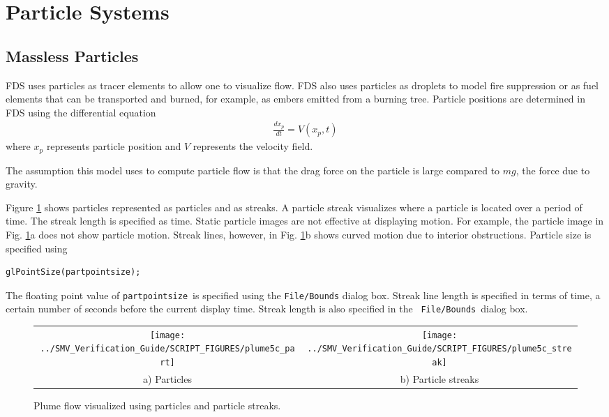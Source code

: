 \documentclass[11pt,twoside]{book}
\begin{document}
\section{Particle Systems}
\subsection{Massless Particles}
FDS uses particles as tracer elements to allow one to visualize
flow.  FDS also uses particles as droplets to model fire
suppression or as fuel elements that can be transported and
burned, for example, as embers emitted from a burning tree.
Particle positions are determined in FDS using the differential
equation
\begin{eqnarray}
\frac{dx_p}{dt}=V(x_p,t)
\end{eqnarray}
where $x_p$ represents particle position and $V$ represents the
velocity field.

The assumption this model uses to compute particle flow is that
the drag force on the particle is large compared to $mg$, the
force due to gravity.

Figure \ref{figpart} shows particles represented as particles and
as streaks. A particle streak visualizes where a particle is
located over a period of time.  The streak length is specified as
time. Static particle images are not effective at displaying
motion.  For example, the particle image in Fig. \ref{figpart}a
does not show particle motion.  Streak lines, however, in Fig.
\ref{figpart}b shows curved motion due to interior obstructions.
Particle size is specified using
\begin{lstlisting}
glPointSize(partpointsize);
\end{lstlisting}
The floating point value of {\tt partpointsize}\ is specified
using the {\tt File/Bounds} dialog box.  Streak line length is
specified in terms of time, a certain number of seconds before the
current display time.  Streak length is also specified in the {\tt
File/Bounds}\ dialog box.

\begin{figure}[bph]
\begin{center}
\begin{tabular}{cc}
\texttt{[image: ../SMV\_Verification\_Guide/SCRIPT\_FIGURES/plume5c\_part]}&
\texttt{[image: ../SMV\_Verification\_Guide/SCRIPT\_FIGURES/plume5c\_streak]}\\
a) Particles&b) Particle streaks\\
\end{tabular}
\end{center}
\caption{Plume flow visualized using particles and particle streaks.}
\label{figpart}%
\end{figure}
\end{document}
